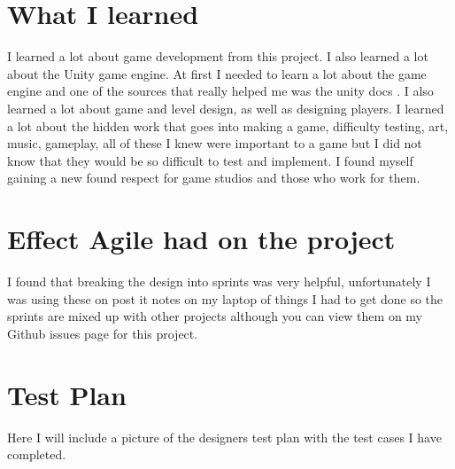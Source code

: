 \documentclass{report}
\begin{document}
\section{What I learned}
I learned a lot about game development from this project.  I also learned a lot about the Unity game engine.  At first I needed to learn a lot about the game engine and one of the sources that really helped me was the unity docs \cite{UnityDocs}.  I also learned a lot about game and level design, as well as designing players. I learned a lot about the hidden work that goes into making a game, difficulty testing, art, music, gameplay, all of these I knew were important to a game but I did not know that they would be so difficult to test and implement. I found myself gaining a new found respect for game studios and those who work for them.
\section{Effect Agile had on the project}
I found that breaking the design into sprints was very helpful, unfortunately I was using these on post it notes on my laptop of things I had to get done so the sprints are mixed up with other projects although you can view them on my Github issues page for this project.
\section{Test Plan}
Here I will include a picture of the designers test plan with the test cases I have completed.


\end{document}
